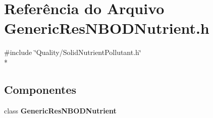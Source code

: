 \section{Referência do Arquivo Generic\+Res\+N\+B\+O\+D\+Nutrient.\+h}
\label{_generic_res_n_b_o_d_nutrient_8h}
{\ttfamily \#include \char`\"{}Quality/\+Solid\+Nutrient\+Pollutant.\+h\char`\"{}}\\*
\subsection*{Componentes}
\begin{DoxyCompactItemize}
\item 
class {\bf Generic\+Res\+N\+B\+O\+D\+Nutrient}
\end{DoxyCompactItemize}
